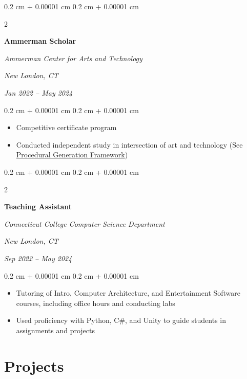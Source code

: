 \documentclass[10pt, letterpaper]{article}
\newenvironment{highlights}{
    \begin{itemize}[
        topsep=0.10 cm,
        parsep=0.10 cm,
        partopsep=0pt,
        itemsep=0pt,
        leftmargin=0.4 cm + 10pt
    ]
}{
    \end{itemize}
} %
\newenvironment{onecolentry}{
    \begin{adjustwidth}{
        0.2 cm + 0.00001 cm
    }{
        0.2 cm + 0.00001 cm
    }
}{
    \end{adjustwidth}
} %
\newenvironment{twocolentry}[2][]{
    \onecolentry
    \def\secondColumn{#2}
    \setcolumnwidth{\fill, 4.5 cm}
    \begin{paracol}{2}
}{
    \switchcolumn \raggedleft \secondColumn
    \end{paracol}
    \endonecolentry
} %
\begin{document}
        \begin{twocolentry}{
        \textit{New London, CT}    
            
        \textit{Jan 2022 – May 2024}}
            \textbf{Ammerman Scholar}
            
            \textit{Ammerman Center for Arts and Technology}
        \end{twocolentry}

        \vspace{0.10 cm}
        \begin{onecolentry}
            \begin{highlights}
                \item Competitive certificate program
                \item Conducted independent study in intersection of art and technology (See \hyperlink{proj:pgf}{Procedural Generation Framework})
                \end{highlights}
        \end{onecolentry}


        \begin{twocolentry}{
        \textit{New London, CT}    
            
        \textit{Sep 2022 – May 2024}}
            \textbf{Teaching Assistant}
            
            \textit{Connecticut College Computer Science Department}
        \end{twocolentry}

        \vspace{0.10 cm}
        \begin{onecolentry}
            \begin{highlights}
                \item Tutoring of Intro, Computer Architecture, and Entertainment Software courses, including office hours and conducting labs
                \item Used proficiency with Python, C\#, and Unity to guide students in assignments and projects
            \end{highlights}
        \end{onecolentry}



    
    \section{Projects}
\end{document}
